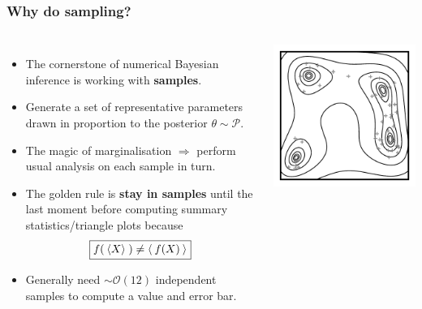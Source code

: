 \documentclass[aspectratio=169]{beamer}
\begin{document}
\begin{frame}
    \frametitle{Why do sampling?}
    \begin{columns}[T]
        \begin{itemize}
            \item The cornerstone of numerical Bayesian inference is working with \textbf{samples}.
            \item Generate a set of representative parameters drawn in proportion to the posterior $\theta\sim\mathcal{P}$.
            \item The magic of marginalisation $\Rightarrow$ perform usual analysis on each sample in turn.
            \item The golden rule is \textbf{stay in samples} until the last moment before computing summary statistics/triangle plots because \[\boxed{f(\:\left\langle X\right\rangle_{}\:)\ne \left\langle \:f(X)\:\right\rangle_{}}\]
            \item Generally need $\sim\mathcal{O}(12)$ independent samples to compute a value and error bar.
        \end{itemize}
        \vspace{-1.8em}
        \begin{center}
            \includegraphics[width=\textwidth]{figures/himmelblau_samples.pdf}
        \end{center}
    \end{columns}
\end{frame}
\end{document}
